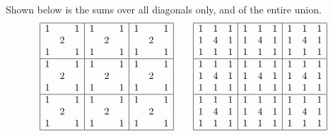 Shown below is the sums over all diagonals only,
and of the entire union.
\[
 \begin{array}{|ccc|ccc|ccc|} \hline
  1 &   & 1 & 1 &   & 1 & 1 &   & 1 \\
  & 2 &   &   & 2 &   &   & 2 &   \\
  1 &   & 1 & 1 &   & 1 & 1 &   & 1 \\\hline
  1 &   & 1 & 1 &   & 1 & 1 &   & 1 \\
  & 2 &   &   & 2 &   &   & 2 &   \\
  1 &   & 1 & 1 &   & 1 & 1 &   & 1 \\\hline
  1 &   & 1 & 1 &   & 1 & 1 &   & 1 \\
  & 2 &   &   & 2 &   &   & 2 &   \\
  1 &   & 1 & 1 &   & 1 & 1 &   & 1 \\\hline
 \end{array}
 \qquad
 \begin{array}{|ccc|ccc|ccc|} \hline
    1 & 1 & 1 & 1 & 1 & 1 & 1 & 1 & 1 \\
    1 & 4 & 1 & 1 & 4 & 1 & 1 & 4 & 1 \\
    1 & 1 & 1 & 1 & 1 & 1 & 1 & 1 & 1 \\\hline
    1 & 1 & 1 & 1 & 1 & 1 & 1 & 1 & 1 \\
    1 & 4 & 1 & 1 & 4 & 1 & 1 & 4 & 1 \\
    1 & 1 & 1 & 1 & 1 & 1 & 1 & 1 & 1 \\\hline
    1 & 1 & 1 & 1 & 1 & 1 & 1 & 1 & 1 \\
    1 & 4 & 1 & 1 & 4 & 1 & 1 & 4 & 1 \\
    1 & 1 & 1 & 1 & 1 & 1 & 1 & 1 & 1 \\\hline
 \end{array}
\]
\pagebreak